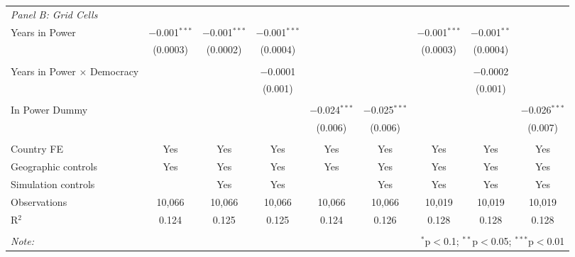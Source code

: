 \documentclass[11pt, oneside]{article}   	%
\begin{document}
\begin{table}[!t]
{\begin{tabular}{@{\extracolsep{5pt}}lcccccccc}
\multicolumn{9}{l}{\textit{Panel B: Grid Cells}} \\
  Years in Power & $-$0.001$^{***}$ & $-$0.001$^{***}$ & $-$0.001$^{***}$ &  &  & $-$0.001$^{***}$ & $-$0.001$^{**}$ &  \\
   & (0.0003) & (0.0002) & (0.0004) &  &  & (0.0003) & (0.0004) &  \\
   & & & & & & & & \\
  Years in Power $\times$ Democracy &  &  & $-$0.0001 &  &  &  & $-$0.0002 &  \\
   &  &  & (0.001) &  &  &  & (0.001) &  \\
   & & & & & & & & \\
  In Power Dummy &  &  &  & $-$0.024$^{***}$ & $-$0.025$^{***}$ &  &  & $-$0.026$^{***}$ \\
   &  &  &  & (0.006) & (0.006) &  &  & (0.007) \\
   & & & & & & & & \\

 Country FE & Yes & Yes & Yes & Yes & Yes & Yes & Yes & Yes \\
 Geographic controls & Yes & Yes & Yes & Yes & Yes & Yes & Yes & Yes \\
 Simulation controls &  & Yes & Yes &  & Yes & Yes & Yes & Yes \\
 Observations & 10,066 & 10,066 & 10,066 & 10,066 & 10,066 & 10,019 & 10,019 & 10,019 \\
 R$^{2}$ & 0.124 & 0.125 & 0.125 & 0.124 & 0.126 & 0.128 & 0.128 & 0.128 \\
 \hline
 \hline \\[-1.8ex]
 \textit{Note:}  & \multicolumn{8}{r}{$^{*}$p$<$0.1; $^{**}$p$<$0.05; $^{***}$p$<$0.01} \\
 \end{tabular}

}


\end{table}
\end{document}
